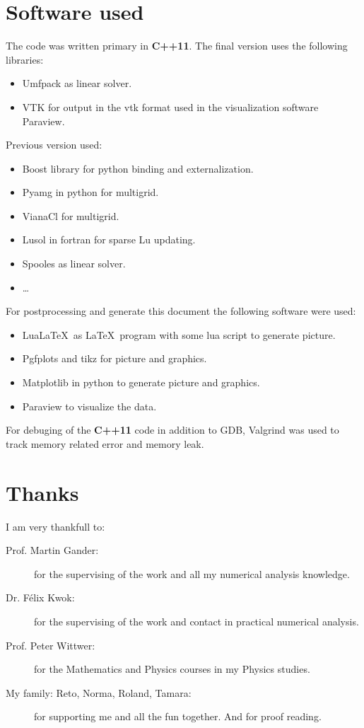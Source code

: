 \section{Software used}

The code was written primary in \textbf{C++11}.
The final version uses the following libraries:
\begin{itemize}
 \item Umfpack as linear solver.
 \item VTK for output in the vtk format used in the visualization software Paraview.
\end{itemize}

Previous version used:
\begin{itemize}
 \item Boost library for python binding and externalization.
 \item Pyamg in python for multigrid.
 \item VianaCl for multigrid.
 \item Lusol in fortran for sparse Lu updating.
 \item Spooles as linear solver.
 \item \ldots
\end{itemize}

For postprocessing and generate this document the following software were used:
\begin{itemize}
 \item Lua\LaTeX \ as \LaTeX \ program with some lua script to generate picture.
 \item Pgfplots and tikz for picture and graphics.
 \item Matplotlib in python to generate picture and graphics.
 \item Paraview to visualize the data.
\end{itemize}

For debuging of the \textbf{C++11} code in addition to GDB, Valgrind was used to track memory
related error and memory leak.

\section{Thanks}

I am very thankfull to:
\begin{description}
 \item[Prof. Martin Gander:] for the supervising of the work and all my numerical analysis knowledge.
 \item[Dr. Félix Kwok:] for the supervising of the work and contact in practical numerical analysis.
 \item[Prof. Peter Wittwer:] for the Mathematics and Physics courses in my Physics studies.
 \item[My family: Reto, Norma, Roland, Tamara:] for supporting me and all the fun together.
 And for proof reading.
\end{description}

